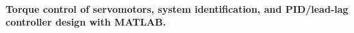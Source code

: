 \documentclass[a4paper]{article}
\begin{document}
\paragraph{Torque control of servomotors, system identification, and PID/lead-lag controller design with MATLAB.}%
\end{document}
